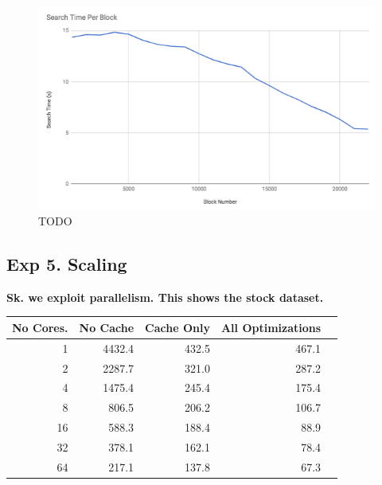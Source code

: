  \begin{figure}[ht]
\centering
 \includegraphics[width=0.9\columnwidth]{figures/draft-blocks.png}
 \caption{TODO
 \label{fig:opt}}
\end{figure}


\subsection*{Exp 5. Scaling}
\textbf{Sk. we exploit parallelism. This shows the stock dataset.}

\begin{table}[ht]
\centering
\label{my-label}
\begin{tabular}{|r|r|r|r|r|}
\hline
No Cores.   & No Cache & Cache Only & All Optimizations \\
\hline
1 & 4432.4 & 432.5 & 467.1 \\ \hline
2 & 2287.7 & 321.0 & 287.2 \\ \hline
4 & 1475.4 & 245.4 & 175.4 \\ \hline
8 & 806.5  & 206.2 & 106.7 \\ \hline
16 & 588.3  & 188.4 & 88.9  \\ \hline
32 & 378.1  & 162.1 & 78.4  \\ \hline
64 & 217.1  & 137.8 & 67.3    \\
\hline
\end{tabular}
\end{table}
